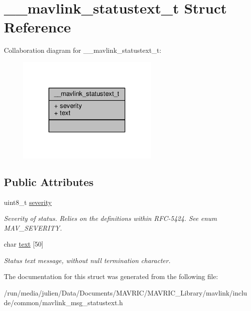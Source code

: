 \hypertarget{struct____mavlink__statustext__t}{\section{\+\_\+\+\_\+mavlink\+\_\+statustext\+\_\+t Struct Reference}
\label{struct____mavlink__statustext__t}
}


Collaboration diagram for \+\_\+\+\_\+mavlink\+\_\+statustext\+\_\+t\+:
\nopagebreak
\begin{figure}[H]
\begin{center}
\leavevmode
\includegraphics[width=198pt]{struct____mavlink__statustext__t__coll__graph}
\end{center}
\end{figure}
\subsection*{Public Attributes}
\begin{DoxyCompactItemize}
\item 
\hypertarget{struct____mavlink__statustext__t_a3078f8993a445c45f44e2f3127c38291}{uint8\+\_\+t \hyperlink{struct____mavlink__statustext__t_a3078f8993a445c45f44e2f3127c38291}{severity}}\label{struct____mavlink__statustext__t_a3078f8993a445c45f44e2f3127c38291}

\begin{DoxyCompactList}\small\item\em Severity of status. Relies on the definitions within R\+F\+C-\/5424. See enum M\+A\+V\+\_\+\+S\+E\+V\+E\+R\+I\+T\+Y. \end{DoxyCompactList}\item 
\hypertarget{struct____mavlink__statustext__t_a234f69635a50c2af18dadeff2b91b474}{char \hyperlink{struct____mavlink__statustext__t_a234f69635a50c2af18dadeff2b91b474}{text} \mbox{[}50\mbox{]}}\label{struct____mavlink__statustext__t_a234f69635a50c2af18dadeff2b91b474}

\begin{DoxyCompactList}\small\item\em Status text message, without null termination character. \end{DoxyCompactList}\end{DoxyCompactItemize}


The documentation for this struct was generated from the following file\+:\begin{DoxyCompactItemize}
\item 
/run/media/julien/\+Data/\+Documents/\+M\+A\+V\+R\+I\+C/\+M\+A\+V\+R\+I\+C\+\_\+\+Library/mavlink/include/common/mavlink\+\_\+msg\+\_\+statustext.\+h\end{DoxyCompactItemize}
